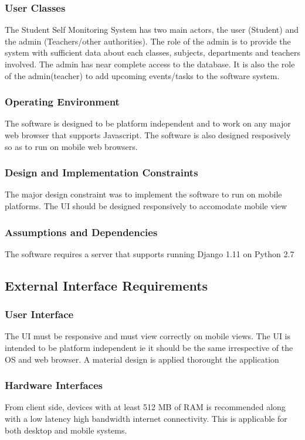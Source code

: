 \subsubsection{User Classes}
The Student Self Monitoring System has two main actors, the user (Student) and the admin (Teachers/other authorities). The role of the admin is to provide the system with sufficient data about each classes, subjects, departments and teachers involved. The admin has near complete access to the database. It is also the role of the admin(teacher) to add upcoming events/tasks to the software system.

\subsubsection{Operating Environment}
The software is designed to be platform independent and to work on any major web browser that supports Javascript. The software is also designed resposively so as to run on mobile web browsers.

\subsubsection{Design and Implementation Constraints}
The major design constraint was to implement the software to run on mobile platforms. The UI should be designed responsively to accomodate mobile view

\subsubsection{Assumptions and Dependencies}
The software requires a server that supports running Django 1.11 on Python 2.7

\subsection{External Interface Requirements}

\subsubsection{User Interface}
The UI must be responsive and must view correctly on mobile views. The UI is intended to be platform independent ie it should be the same irrespective of the OS and web browser. A material design is applied thorought the application

\subsubsection{Hardware Interfaces}
From client side, devices with at least 512 MB of RAM is recommended along with a low latency high bandwidth internet connectivity. This is applicable for both desktop and mobile systems.

